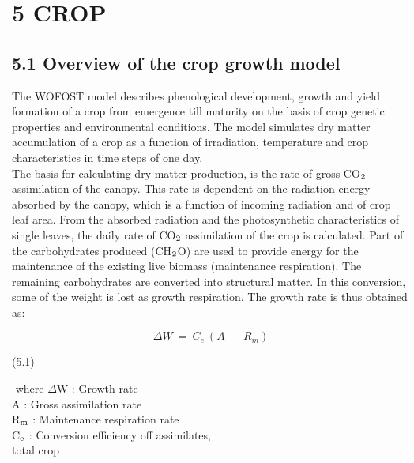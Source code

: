 \documentclass[11pt]{article}
\begin{document}
\setcounter{page}{39}\pagenumpos{\pnbr}
\section{  5 CROP  }

\bigskip
\bigskip

\subsection{  5.1 Overview of the crop growth model  }

The WOFOST model describes phenological development, growth and yield forma\-tion of
a crop from emergence till maturity on the basis of crop genetic properties and environ\-mental conditions. The model simulates dry matter accumulation of a crop as a function
of irradiation, temperature and crop characteristics in time steps of one day. \\
The basis for calculating dry matter production, is the rate of gross CO$_{{\rm 2}}$ assimilation of
the canopy. This rate is dependent on the radiation energy absorbed by the canopy, which
is a function of incoming radiation and of crop leaf area. From the absorbed radiation and
the photosynthetic characteristics of single leaves, the daily rate of CO$_{{\rm 2}}$ assimilation of the
crop is calculated. Part of the carbohydrates produced (CH$_{{\rm 2}}$O) are used to provide energy
for the maintenance of the existing live biomass (maintenance respiration). The remaining
carbohydrates are converted into structural matter. In this conversion, some of the weight
is lost as growth respir\-ation. The growth rate is thus obtained as:

\begin{displaymath}
\Delta W ~=~ C _{e} ~( A ~-~ R _{m} )
\end{displaymath}

 \bigskip
\strut\hfill (5.1)
\nwln
\begin{tabbing}
\hspace{1.27cm}\=\hspace{1.27cm}\=\hspace{1.27cm}\=\hspace{1.27cm}\=%
\hspace{1.27cm}\=\hspace{1.27cm}\=\hspace{1.27cm}\=\hspace{1.27cm}\=%
\hspace{1.27cm}\=\hspace{1.27cm}\=\kill
where\> $\Delta$W\> : Growth rate \> \> \> \> \> \\
\>A \> : Gross assimilation\> \> \> rate\> \> \> [kg CH$_{{\rm 2}}$O ha$^{{\rm -1}}$ d$^{{\rm -1}}$]\\
\>R$_{{\rm m}}$ \> : Maintenance respiration rate\> \> \> \> \> \> [kg CH$_{{\rm 2}}$O ha$^{{\rm -1}}$ d$^{{\rm -1}}$]\\
\>C$_{{\rm e}}$\> : Conversion efficiency off assimilates,\\
\>\>   total crop\> \> \> \> \> 
\end{tabbing}
\end{document}
